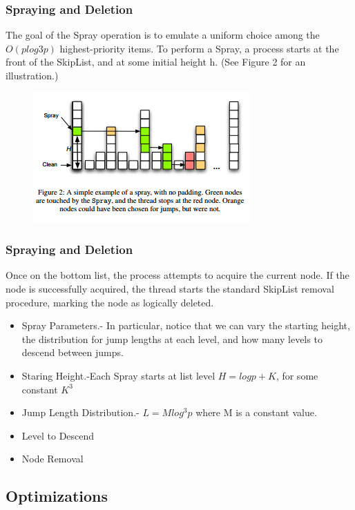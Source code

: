 \documentclass{beamer}
\begin{document}
\begin{frame}
\frametitle{Spraying and Deletion}

The goal of the Spray operation is to emulate a uniform choice
among the $O(plog3
p)$ highest-priority items. To perform a Spray,
a process starts at the front of the SkipList, and at some initial
height h. (See Figure 2 for an illustration.)

\begin{figure}
\includegraphics[width=0.5\linewidth]{SL2}
\end{figure}

\end{frame}



\begin{frame}
\frametitle{Spraying and Deletion}
Once on the bottom list, the process attempts to acquire the
current node. If the node is successfully acquired, the thread starts the standard SkipList removal procedure, marking the node as logically deleted.\\

\begin{itemize}
\item Spray Parameters.- In particular, notice that we can vary the starting height, the distribution for jump lengths at each level, and how many levels to descend between jumps.
\item Staring Height.-Each Spray starts at list level $H = log p + K$, for some constant $K^3$
\item Jump Length Distribution.- $L=M log^3 p$ where M is a constant value.
\item Level to Descend
\item Node Removal
\end{itemize}

\end{frame}




\subsection{Optimizations}
\end{document}

